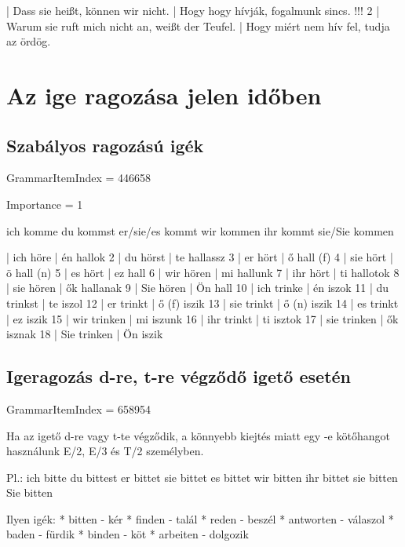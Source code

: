 \documentclass{article}
\newenvironment{desc}{\verbatim}{\endverbatim}
\newenvironment{exmp}{\verbatim}{\endverbatim}
\begin{document}
\begin{exmp}
1 | Dass sie heißt, können wir nicht. | Hogy hogy hívják, fogalmunk sincs. !!!
2 | Warum sie ruft mich nicht an, weißt der Teufel. | Hogy miért nem hív fel, tudja az ördög.
\end{exmp}


\section{Az ige ragozása jelen időben}

\subsection{Szabályos ragozású igék}

GrammarItemIndex = 446658

Importance = 1

\begin{desc}
ich komme
du kommst
er/sie/es kommt
wir kommen
ihr kommt
sie/Sie kommen
\end{desc}

\begin{exmp}
1 | ich höre | én hallok
2 | du hörst | te hallassz
3 | er hört | ő hall (f)
4 | sie hört | ö hall (n)
5 | es hört | ez hall
6 | wir hören | mi hallunk
7 | ihr hört | ti hallotok
8 | sie hören | ők hallanak
9 | Sie hören | Ön hall
10 | ich trinke | én iszok
11 | du trinkst | te iszol
12 | er trinkt | ő (f) iszik
13 | sie trinkt | ő (n) iszik
14 | es trinkt | ez iszik
15 | wir trinken | mi iszunk
16 | ihr trinkt | ti isztok
17 | sie trinken | ők isznak
18 | Sie trinken | Ön iszik
\end{exmp}

\subsection{Igeragozás d-re, t-re végződő igető esetén}

GrammarItemIndex = 658954

\begin{desc}
Ha az igető d-re vagy t-te végződik, a könnyebb kiejtés miatt egy -e
kötőhangot használunk E/2, E/3 és T/2 személyben.

Pl.:
ich bitte
du bittest
er bittet
sie bittet
es bittet
wir bitten
ihr bittet
sie bitten
Sie bitten

Ilyen igék:
* bitten - kér
* finden - talál
* reden - beszél
* antworten - válaszol
* baden - fürdik
* binden - köt
* arbeiten - dolgozik
\end{desc}
\end{document}
